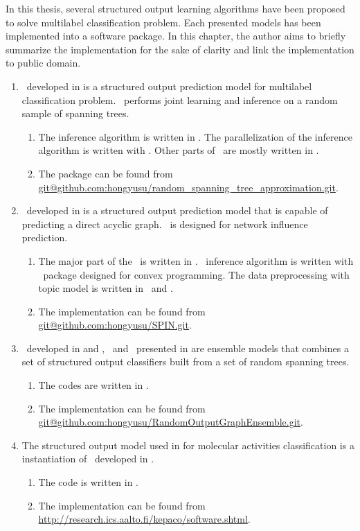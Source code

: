 {In this thesis, several structured output learning algorithms have been proposed to solve multilabel classification problem.
Each presented models has been implemented into a software package.
In this chapter, the author aims to briefly summarize the implementation for the sake of clarity and link the implementation to public domain.

\begin{enumerate}
	\item \rta\ developed in  is a structured output prediction model for multilabel classification problem. \rta\ performs joint learning and inference on a random sample of spanning trees.
	\begin{enumerate}
		\item The inference algorithm is written in \cpp. The parallelization of the inference algorithm is written with \openmp. Other parts of \rta\ are mostly written in \matlab.
		\item The package can be found from \url{git@github.com:hongyusu/random_spanning_tree_approximation.git}.
	\end{enumerate}
	\item \spin\ developed in  is a structured output prediction model that is capable of predicting a direct acyclic graph. \spin\ is designed for network influence prediction.
	\begin{enumerate}
		\item The major part of the \rta\ is written in \matlab. \sdp\ inference algorithm is written with \cvx\ package designed for convex programming. The data preprocessing with topic model is written in \python\ and \matlab.
		\item The implementation can be found from \url{git@github.com:hongyusu/SPIN.git}.
	\end{enumerate}
	\item \mve\ developed in  and , \amm\ and \mam\ presented in  are ensemble models that combines a set of structured output classifiers built from a set of random spanning trees.
	\begin{enumerate}
		\item The codes are written in \matlab.
		\item The implementation can be found from \url{git@github.com:hongyusu/RandomOutputGraphEnsemble.git}.
	\end{enumerate}
	\item The structured output model used in  for molecular activities classification is a instantiation of \mmcrf\ developed in \cite{rousu06}.
	\begin{enumerate}
		\item The code is written in \matlab.
		\item The implementation can be found from \url{http://research.ics.aalto.fi/kepaco/software.shtml}.
	\end{enumerate}
\end{enumerate}




}
